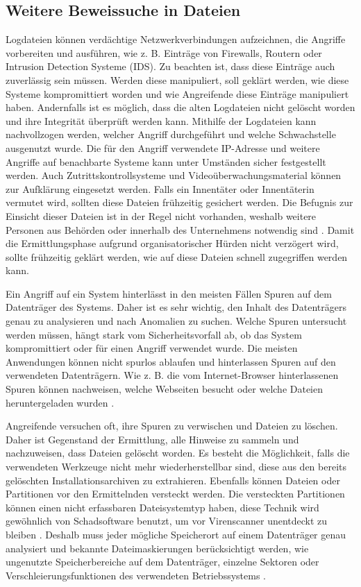\documentclass[12pt,DIV=14, version=first, BCOR=10mm,a4paper,twoside,parskip=half-,headsepline,headinclude]{scrartcl}
\begin{document}
    \subsection{Weitere Beweissuche in Dateien}
    Logdateien können verdächtige Netzwerkverbindungen aufzeichnen, die Angriffe vorbereiten und ausführen, wie z. B. Einträge von Firewalls, Routern oder Intrusion Detection Systeme (IDS). Zu beachten ist, dass diese Einträge auch zuverlässig sein müssen. Werden diese manipuliert, soll geklärt werden, wie diese Systeme kompromittiert worden und wie Angreifende diese Einträge manipuliert haben. Andernfalls ist es möglich, dass die alten Logdateien nicht gelöscht worden und ihre Integrität überprüft werden kann. Mithilfe der Logdateien kann nachvollzogen werden, welcher Angriff durchgeführt und welche Schwachstelle ausgenutzt wurde. Die für den Angriff verwendete IP-Adresse und weitere Angriffe auf benachbarte Systeme kann unter Umständen sicher festgestellt werden. Auch Zutrittskontrollsysteme und Videoüberwachungsmaterial können zur Aufklärung eingesetzt werden. Falls ein Innentäter oder Innentäterin vermutet wird, sollten diese Dateien frühzeitig gesichert werden. Die Befugnis zur Einsicht dieser Dateien ist in der Regel nicht vorhanden, weshalb weitere Personen aus Behörden oder innerhalb des Unternehmens notwendig sind \cite[vgl. S. 74-75]{texbook01}. Damit die Ermittlungsphase aufgrund organisatorischer Hürden nicht verzögert wird, sollte frühzeitig geklärt werden, wie auf diese Dateien schnell zugegriffen werden kann.
    
    Ein Angriff auf ein System hinterlässt in den meisten Fällen Spuren auf dem Datenträger des Systems. Daher ist es sehr wichtig, den Inhalt des Datenträgers genau zu analysieren und nach Anomalien zu suchen. Welche Spuren untersucht werden müssen, hängt stark vom Sicherheitsvorfall ab, ob das System kompromittiert oder für einen Angriff verwendet wurde. Die meisten Anwendungen können nicht spurlos ablaufen und hinterlassen Spuren auf den verwendeten Datenträgern. Wie z. B. die vom Internet-Browser hinterlassenen Spuren können nachweisen, welche Webseiten besucht oder welche Dateien heruntergeladen wurden \cite[vgl. S. 74-75]{texbook01}.
    
    Angreifende versuchen oft, ihre Spuren zu verwischen und Dateien zu löschen. Daher ist Gegenstand der Ermittlung, alle Hinweise zu sammeln und nachzuweisen, dass Dateien gelöscht worden. Es besteht die Möglichkeit, falls die verwendeten Werkzeuge nicht mehr wiederherstellbar sind, diese aus den bereits gelöschten Installationsarchiven zu extrahieren. Ebenfalls können Dateien oder Partitionen vor den Ermittelnden versteckt werden. Die versteckten Partitionen können einen nicht erfassbaren Dateisystemtyp haben, diese Technik wird gewöhnlich von Schadsoftware benutzt, um vor Virenscanner unentdeckt zu bleiben \cite[vgl. S. 134]{texbook02}. Deshalb muss jeder mögliche Speicherort auf einem Datenträger genau analysiert und bekannte Dateimaskierungen berücksichtigt werden, wie ungenutzte Speicherbereiche auf dem Datenträger, einzelne Sektoren oder Verschleierungsfunktionen des verwendeten Betriebssystems \cite[vgl. S. 76]{texbook01}.
    
\end{document}
